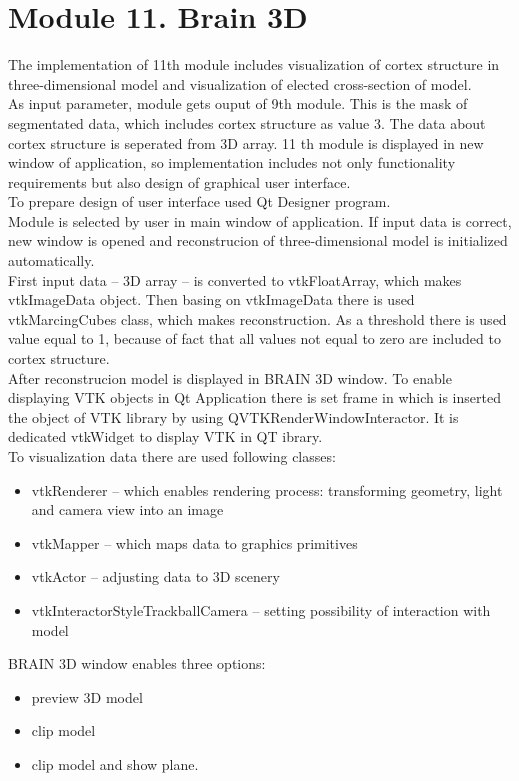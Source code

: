 \section{Module 11. Brain 3D}

\indent The implementation of 11th module includes visualization of cortex structure in three-dimensional model and visualization of elected cross-section of model. \\
\indent  As input parameter, module gets ouput of 9th module. This is the mask of segmentated data, which includes cortex structure as value 3. The data about cortex structure is seperated from 3D array.
11 th module is displayed in new window of application, so implementation includes not only functionality requirements but also design of graphical user interface.  \\
\indent To prepare design of user interface used Qt Designer program. \\
\indent Module is selected by user in main window of application. If input data is correct, new window is opened and reconstrucion of three-dimensional model is initialized automatically. \\
\indent First input data – 3D array – is converted to vtkFloatArray, which makes vtkImageData object. Then basing on vtkImageData there is used vtkMarcingCubes class, which makes reconstruction. As a threshold there is used value equal to 1, because of fact that all values not equal to zero are included to cortex structure. \\
\indent After reconstrucion model is displayed in BRAIN 3D window. To enable displaying VTK objects in Qt Application there is set frame in which is inserted the object of VTK library by using QVTKRenderWindowInteractor. It is dedicated vtkWidget to display VTK in QT ibrary.\\
\indent To visualization data there are used following classes:
\begin{itemize}
\item vtkRenderer – which enables rendering process: transforming geometry, light and camera view into an image
\item 
vtkMapper – which maps data to graphics primitives
\item vtkActor – adjusting data to 3D scenery
\item vtkInteractorStyleTrackballCamera – setting possibility of interaction with model
\end{itemize}
\indent BRAIN 3D window enables three options:
\begin{itemize}
\item preview 3D model
\item clip model 
\item clip model and show plane.
\end{itemize}
